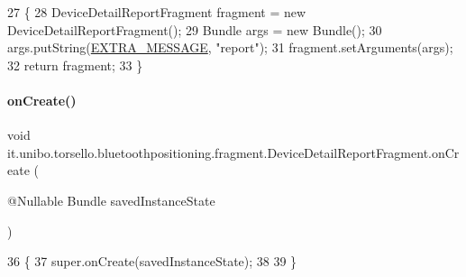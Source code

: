 \begin{DoxyCode}
27                                                            \{
28         DeviceDetailReportFragment fragment = \textcolor{keyword}{new} DeviceDetailReportFragment();
29         Bundle args = \textcolor{keyword}{new} Bundle();
30         args.putString(\hyperlink{classit_1_1unibo_1_1torsello_1_1bluetoothpositioning_1_1fragment_1_1DeviceDetailReportFragment_a906b92cc5a18c57393f96a1fbc1dec15_a906b92cc5a18c57393f96a1fbc1dec15}{EXTRA\_MESSAGE}, \textcolor{stringliteral}{"report"});
31         fragment.setArguments(args);
32         \textcolor{keywordflow}{return} fragment;
33     \}
\end{DoxyCode}
\hypertarget{classit_1_1unibo_1_1torsello_1_1bluetoothpositioning_1_1fragment_1_1DeviceDetailReportFragment_a96859a689bc31c69a329d6f2b198c860_a96859a689bc31c69a329d6f2b198c860}{}\label{classit_1_1unibo_1_1torsello_1_1bluetoothpositioning_1_1fragment_1_1DeviceDetailReportFragment_a96859a689bc31c69a329d6f2b198c860_a96859a689bc31c69a329d6f2b198c860} 
\paragraph{\texorpdfstring{on\+Create()}{onCreate()}}
{\footnotesize\ttfamily void it.\+unibo.\+torsello.\+bluetoothpositioning.\+fragment.\+Device\+Detail\+Report\+Fragment.\+on\+Create (\begin{DoxyParamCaption}\item[{@Nullable Bundle}]{saved\+Instance\+State }\end{DoxyParamCaption})}


\begin{DoxyCode}
36                                                               \{
37         super.onCreate(savedInstanceState);
38 
39     \}
\end{DoxyCode}
\hypertarget{classit_1_1unibo_1_1torsello_1_1bluetoothpositioning_1_1fragment_1_1DeviceDetailReportFragment_a5aa4df017085deeac5a427fcc63a4fc9_a5aa4df017085deeac5a427fcc63a4fc9}{}\label{classit_1_1unibo_1_1torsello_1_1bluetoothpositioning_1_1fragment_1_1DeviceDetailReportFragment_a5aa4df017085deeac5a427fcc63a4fc9_a5aa4df017085deeac5a427fcc63a4fc9} 
